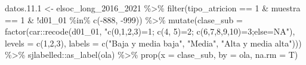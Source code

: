 \documentclass[
  12pt,
]{book}
\newenvironment{Shaded}{\begin{snugshade}}{\end{snugshade}}
\newcommand{\AttributeTok}[1]{\textcolor[rgb]{0.77,0.63,0.00}{#1}}
\newcommand{\DecValTok}[1]{\textcolor[rgb]{0.00,0.00,0.81}{#1}}
\newcommand{\FloatTok}[1]{\textcolor[rgb]{0.00,0.00,0.81}{#1}}
\newcommand{\FunctionTok}[1]{\textcolor[rgb]{0.00,0.00,0.00}{#1}}
\newcommand{\NormalTok}[1]{#1}
\newcommand{\OtherTok}[1]{\textcolor[rgb]{0.56,0.35,0.01}{#1}}
\newcommand{\SpecialCharTok}[1]{\textcolor[rgb]{0.00,0.00,0.00}{#1}}
\newcommand{\StringTok}[1]{\textcolor[rgb]{0.31,0.60,0.02}{#1}}
\begin{document}
\begin{Shaded}
\begin{Highlighting}[]
\NormalTok{datos.}\FloatTok{11.1} \OtherTok{\textless{}{-}}\NormalTok{ elsoc\_long\_2016\_2021 }\SpecialCharTok{\%\textgreater{}\%} 
  \FunctionTok{filter}\NormalTok{(tipo\_atricion }\SpecialCharTok{==} \DecValTok{1} \SpecialCharTok{\&}\NormalTok{ muestra }\SpecialCharTok{==} \DecValTok{1} \SpecialCharTok{\&} \SpecialCharTok{!}\NormalTok{d01\_01 }\SpecialCharTok{\%in\%} \FunctionTok{c}\NormalTok{(}\SpecialCharTok{{-}}\DecValTok{888}\NormalTok{, }\SpecialCharTok{{-}}\DecValTok{999}\NormalTok{)) }\SpecialCharTok{\%\textgreater{}\%} 
  \FunctionTok{mutate}\NormalTok{(}\AttributeTok{clase\_sub =} \FunctionTok{factor}\NormalTok{(car}\SpecialCharTok{::}\FunctionTok{recode}\NormalTok{(d01\_01, }\StringTok{"c(0,1,2,3)=1; c(4, 5)=2; c(6,7,8,9,10)=3;else=NA"}\NormalTok{), }
                            \AttributeTok{levels =} \FunctionTok{c}\NormalTok{(}\DecValTok{1}\NormalTok{,}\DecValTok{2}\NormalTok{,}\DecValTok{3}\NormalTok{), }
                            \AttributeTok{labels =} \FunctionTok{c}\NormalTok{(}\StringTok{"Baja y media baja"}\NormalTok{, }\StringTok{"Media"}\NormalTok{, }\StringTok{"Alta y media alta"}\NormalTok{))) }\SpecialCharTok{\%\textgreater{}\%} 
\NormalTok{  sjlabelled}\SpecialCharTok{::}\FunctionTok{as\_label}\NormalTok{(ola) }\SpecialCharTok{\%\textgreater{}\%} 
  \FunctionTok{prop}\NormalTok{(}\AttributeTok{x =}\NormalTok{ clase\_sub, }\AttributeTok{by =}\NormalTok{ ola, }\AttributeTok{na.rm =}\NormalTok{ T)}


\end{Highlighting}
\end{Shaded}
\end{document}
